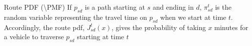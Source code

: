 \documentclass[t]{beamer}
\begin{document}
\begin{frame}
{\begin{alertblock}{Route PDF (\textbackslash PMF)}
If $p_{sd}$ is a path starting at $s$ and ending in $d$, $\pi_{sd}^t$ is the random variable representing the travel time on $p_{sd}$ when we start at time $t$. Accordingly, the route pdf, $J_{sd}^t(x)$, gives the probability of taking $x$ minutes for a vehicle to traverse $p_{sd}$ starting at time $t$
\end{alertblock}
}
\end{frame}
\end{document}
